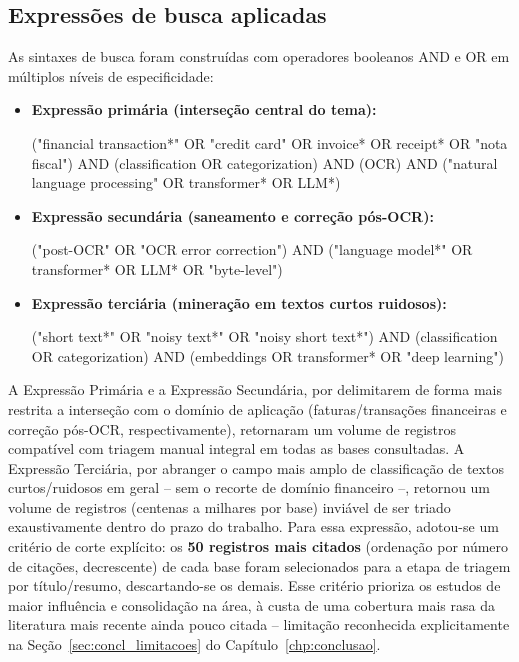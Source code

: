 \begin{apendicesenv}
\section{Expressões de busca aplicadas}
\label{sec:strings_busca}
As sintaxes de busca foram construídas com operadores booleanos AND e OR em múltiplos níveis de especificidade:

\begin{itemize}
	\item \textbf{Expressão primária (interseção central do tema):}
	\begin{searchquery}
		("financial transaction*" OR "credit card" OR invoice* OR receipt* OR "nota fiscal") AND (classification OR categorization) AND (OCR) AND ("natural language processing" OR transformer* OR LLM*)
	\end{searchquery}
	\vspace{4pt}

	\item \textbf{Expressão secundária (saneamento e correção pós-OCR):}
	\begin{searchquery}
		("post-OCR" OR "OCR error correction") AND ("language model*" OR transformer* OR LLM* OR "byte-level")
	\end{searchquery}
	\vspace{4pt}

	\item \textbf{Expressão terciária (mineração em textos curtos ruidosos):}
	\begin{searchquery}
		("short text*" OR "noisy text*" OR "noisy short text*") AND (classification OR categorization) AND (embeddings OR transformer* OR "deep learning")
	\end{searchquery}
\end{itemize}

A Expressão Primária e a Expressão Secundária, por delimitarem de forma mais restrita a interseção com o domínio de aplicação (faturas/transações financeiras e correção pós-OCR, respectivamente), retornaram um volume de registros compatível com triagem manual integral em todas as bases consultadas. A Expressão Terciária, por abranger o campo mais amplo de classificação de textos curtos/ruidosos em geral -- sem o recorte de domínio financeiro --, retornou um volume de registros (centenas a milhares por base) inviável de ser triado exaustivamente dentro do prazo do trabalho. Para essa expressão, adotou-se um critério de corte explícito: os \textbf{50 registros mais citados} (ordenação por número de citações, decrescente) de cada base foram selecionados para a etapa de triagem por título/resumo, descartando-se os demais. Esse critério prioriza os estudos de maior influência e consolidação na área, à custa de uma cobertura mais rasa da literatura mais recente ainda pouco citada -- limitação reconhecida explicitamente na Seção~\ref{sec:concl_limitacoes} do Capítulo~\ref{chp:conclusao}.


\end{apendicesenv}
